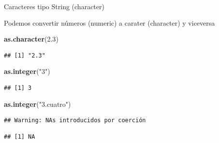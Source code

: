 \documentclass[ignorenonframetext,]{beamer}
\newenvironment{Shaded}{\begin{snugshade}}{\end{snugshade}}
\newcommand{\KeywordTok}[1]{\textcolor[rgb]{0.13,0.29,0.53}{\textbf{#1}}}
\newcommand{\FloatTok}[1]{\textcolor[rgb]{0.00,0.00,0.81}{#1}}
\newcommand{\StringTok}[1]{\textcolor[rgb]{0.31,0.60,0.02}{#1}}
\newcommand{\NormalTok}[1]{#1}
\begin{document}
\begin{frame}[fragile]{Caracteres tipo String (character)}

Podemos convertir números (numeric) a carater (character) y viceversa

\begin{Shaded}
\begin{Highlighting}[]
\KeywordTok{as.character}\NormalTok{(}\FloatTok{2.3}\NormalTok{)}
\end{Highlighting}
\end{Shaded}

\begin{verbatim}
## [1] "2.3"
\end{verbatim}

\begin{Shaded}
\begin{Highlighting}[]
\KeywordTok{as.integer}\NormalTok{(}\StringTok{"3"}\NormalTok{)}
\end{Highlighting}
\end{Shaded}

\begin{verbatim}
## [1] 3
\end{verbatim}

\begin{Shaded}
\begin{Highlighting}[]
\KeywordTok{as.integer}\NormalTok{(}\StringTok{"3.cuatro"}\NormalTok{)}
\end{Highlighting}
\end{Shaded}

\begin{verbatim}
## Warning: NAs introducidos por coerción
\end{verbatim}

\begin{verbatim}
## [1] NA
\end{verbatim}

\end{frame}
\end{document}
